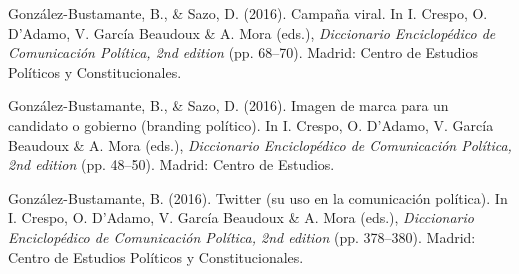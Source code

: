\begin{publications}
\begin{benumerate}{12}

\item{González-Bustamante, B., \& Sazo, D. (2016). Campaña viral. In I. Crespo, O. D'Adamo, V. García Beaudoux \& A. Mora (eds.), {\itshape Diccionario Enciclopédico de Comunicación Política, 2nd edition} (pp. 68--70). Madrid: Centro de Estudios Políticos y Constitucionales.}\vspace{1mm}


\item{González-Bustamante, B., \& Sazo, D. (2016). Imagen de marca para un candidato o gobierno (branding político). In I. Crespo, O. D'Adamo, V. García Beaudoux \& A. Mora (eds.), {\itshape Diccionario Enciclopédico de Comunicación Política, 2nd edition} (pp. 48--50). Madrid: Centro de Estudios.}\vspace{1mm}


\item{González-Bustamante, B. (2016). Twitter (su uso en la comunicación política). In I. Crespo, O. D'Adamo, V. García Beaudoux \& A. Mora (eds.), {\itshape Diccionario Enciclopédico de Comunicación Política, 2nd edition} (pp. 378--380). Madrid: Centro de Estudios Políticos y Constitucionales.}\vspace{1mm}



\end{benumerate}
\end{publications}
